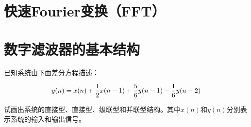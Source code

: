 \documentclass[cn, hazy, blue, normal, 14pt]{elegantnote}
\begin{document}
\begin{solution}[print=false]
    


\end{solution}


\section{快速Fourier变换（FFT）}




\section{数字滤波器的基本结构}

\begin{exercise}

已知系统由下面差分方程描述：

\begin{equation}
\notag
    y(n)=x(n)+\frac{1}{2}x(n-1)+\frac{5}{6}y(n-1)-\frac{1}{6}y(n-2)
\end{equation}

试画出系统的直接\uppercase\expandafter{}型、直接\uppercase\expandafter{}型、级联型和并联型结构。其中$x(n)$和$y(n)$分别表示系统的输入和输出信号。

\end{exercise}
\end{document}
